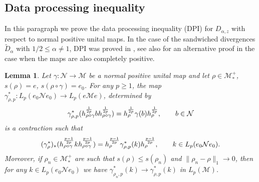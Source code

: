 \documentclass[12pt]{article}
\newtheorem{lemma}[theorem]{Lemma}
\theoremstyle{definition}
\theoremstyle{remark}
\numberwithin{equation}{section}
\def\Me{\mathcal M}
\def\Ne{\mathcal N}
\begin{document}
\subsection{Data processing inequality}


In this paragraph we prove the data processing inequality (DPI) for $D_{\alpha,z}$ with respect to normal
positive unital maps. In the case of the sandwiched divergences $\tilde D_\alpha$ with
$1/2\le \alpha \ne 1$, DPI was proved in \cite{jencova2018renyi,
jencova2021renyi}, see also \cite{berta2018renyi} for an alternative proof in the case
when the maps are  also completely positive.
\begin{lemma}\label{lemma:pcontraction} Let $\gamma:\Ne\to \Me$ be a normal positive unital map and
let $\rho\in \Me_*^+$, $s(\rho)=e$, $s(\rho\circ\gamma)=e_0$.
For any $p\ge 1$, the map $\gamma^*_{\rho,p}:L_p(e_0 \Ne e_0)\to L_p(e\Me e)$, determined
by
\[
\gamma^*_{\rho,p}(h_{\rho\circ\gamma}^{1\over 2p}bh^{1\over
2p}_{\rho\circ\gamma})=h_\rho^{1\over 2p}\gamma(b) h_\rho^{1\over 2p},\qquad b\in \Ne
\]
is a contraction such that 
\[
(\gamma^*_\rho)_*(h_{\rho\circ\gamma}^{p-1\over 2p}kh_{\rho\circ\gamma}^{p-1\over
2p})=h_\rho^{p-1\over 2p}\gamma^*_{\rho,p}(k)h_\rho^{p-1\over 2p},\qquad k\in L_p(e_0 \Ne
e_0).
\]
Moreover, if $\rho_n\in \Me_*^+$ are such that $s(\rho)\le s(\rho_n)$ and
$\|\rho_n-\rho\|_1\to 0$, then for any $k\in L_p(e_0 \Ne e_0)$ we have
$\gamma^*_{\rho_n,p}(k)\to \gamma^*_{\rho,p}(k)$ in $L_p(\Me)$.

\end{lemma}
\end{document}
